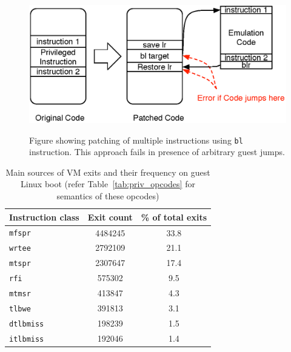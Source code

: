 \documentclass[10pt,twocolumn]{article}
\begin{document}
\begin{figure}[!htb]
\centering

\includegraphics[scale=0.5]{multiple_ins_patching.eps}
\label{fig:multiple_insns_patching}
\caption{Figure showing patching of multiple instructions using {\tt bl} instruction. This approach fails in presence of arbitrary guest jumps.}
\end{figure}

\begin{table}[!b]
\centering
     \begin{tabular}{lcc} \hline
       Instruction class  & Exit count & \% of total exits  \\ \hline
       {\tt mfspr} & 4484245 & 33.8  \\
       {\tt wrtee} & 2792109 & 21.1  \\
       {\tt mtspr} & 2307647 & 17.4  \\
       {\tt rfi} & 575302 & 9.5 \\
       {\tt mtmsr} & 413847 & 4.3 \\
       {\tt tlbwe} & 391813 & 3.1 \\
       {\tt dtlbmiss} & 198239 & 1.5 \\
       {\tt itlbmiss} & 192046 & 1.4 \\
       \hline
     \end{tabular}
\label{tab:linuxboot_exitcount}
\caption{Main sources of VM exits and their frequency on guest Linux boot (refer Table~\ref{tab:priv_opcodes} for semantics of these opcodes)}
\end{table}
\end{document}
